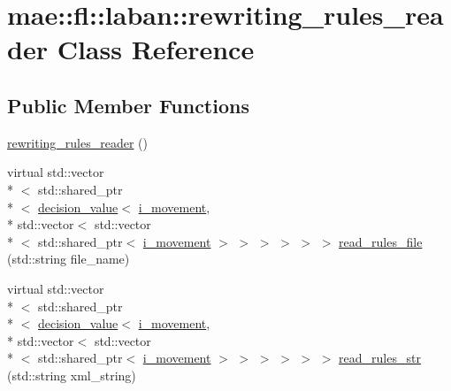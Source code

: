\hypertarget{classmae_1_1fl_1_1laban_1_1rewriting__rules__reader}{\section{mae\-:\-:fl\-:\-:laban\-:\-:rewriting\-\_\-rules\-\_\-reader Class Reference}
\label{classmae_1_1fl_1_1laban_1_1rewriting__rules__reader}
}
\subsection*{Public Member Functions}
\begin{DoxyCompactItemize}
\item 
\hyperlink{classmae_1_1fl_1_1laban_1_1rewriting__rules__reader_afca7b7ea63a56ba6f48d586a3c5f360e}{rewriting\-\_\-rules\-\_\-reader} ()
\item 
virtual std\-::vector\\*
$<$ std\-::shared\-\_\-ptr\\*
$<$ \hyperlink{classmae_1_1fl_1_1laban_1_1decision__value}{decision\-\_\-value}$<$ \hyperlink{classmae_1_1fl_1_1laban_1_1i__movement}{i\-\_\-movement}, \\*
std\-::vector$<$ std\-::vector\\*
$<$ std\-::shared\-\_\-ptr$<$ \hyperlink{classmae_1_1fl_1_1laban_1_1i__movement}{i\-\_\-movement} $>$ $>$ $>$ $>$ $>$ $>$ \hyperlink{classmae_1_1fl_1_1laban_1_1rewriting__rules__reader_ac6c2ccb66ebbf3b52b313a014e8ac642}{read\-\_\-rules\-\_\-file} (std\-::string file\-\_\-name)
\item 
virtual std\-::vector\\*
$<$ std\-::shared\-\_\-ptr\\*
$<$ \hyperlink{classmae_1_1fl_1_1laban_1_1decision__value}{decision\-\_\-value}$<$ \hyperlink{classmae_1_1fl_1_1laban_1_1i__movement}{i\-\_\-movement}, \\*
std\-::vector$<$ std\-::vector\\*
$<$ std\-::shared\-\_\-ptr$<$ \hyperlink{classmae_1_1fl_1_1laban_1_1i__movement}{i\-\_\-movement} $>$ $>$ $>$ $>$ $>$ $>$ \hyperlink{classmae_1_1fl_1_1laban_1_1rewriting__rules__reader_a60f1b64794dee467385b8d6bb9a69f99}{read\-\_\-rules\-\_\-str} (std\-::string xml\-\_\-string)
\end{DoxyCompactItemize}


